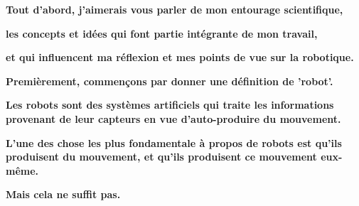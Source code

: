 \documentclass{beamer}
\begin{document}
\begin{frame}
\begin{center}
\textbf{Tout d'abord, j'aimerais vous parler de mon entourage scientifique,
}
\let\thefootnote\relax{}
\end{center}
\end{frame}

\begin{frame}
\begin{center}
\textbf{les concepts et idées qui font partie intégrante de mon travail,
}
\let\thefootnote\relax{}
\end{center}
\end{frame}

\begin{frame}
\begin{center}
\textbf{et qui influencent ma réflexion et mes points de vue sur la robotique.
}
\let\thefootnote\relax{}
\end{center}
\end{frame}

\begin{frame}
\begin{center}
\textbf{Premièrement, commençons par donner une définition de 'robot'.
}
\let\thefootnote\relax{}
\end{center}
\end{frame}

\begin{frame}
\begin{center}
\textbf{Les robots sont des systèmes artificiels qui traite les informations provenant de leur capteurs en vue d'auto-produire du mouvement.
}
\let\thefootnote\relax{}
\end{center}
\end{frame}

\begin{frame}
\begin{center}
\textbf{L'une des chose les plus fondamentale à propos de robots est qu'ils produisent du mouvement, et qu'ils produisent ce mouvement eux-même.
}
\let\thefootnote\relax{}
\end{center}
\end{frame}

\begin{frame}
\begin{center}
\textbf{Mais cela ne suffit pas.
}
\let\thefootnote\relax{}
\end{center}
\end{frame}
\end{document}
